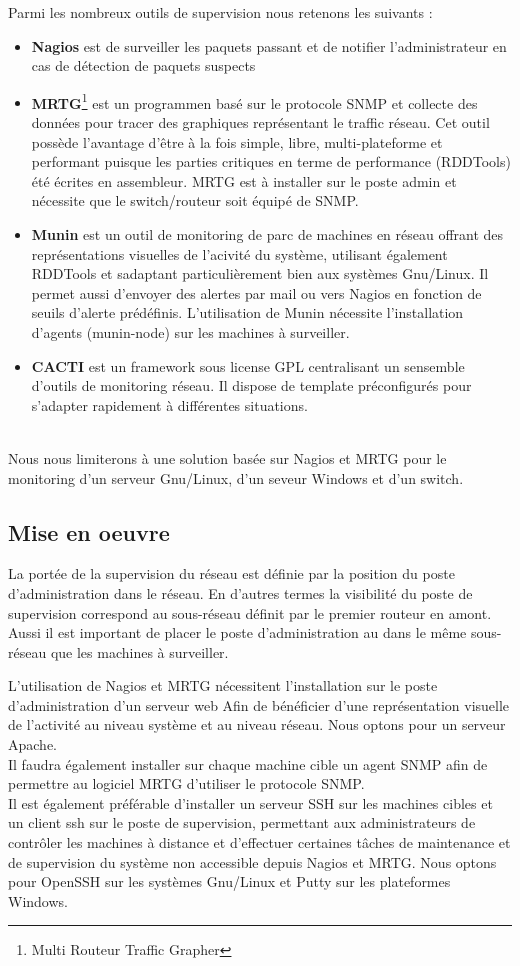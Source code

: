\documentclass[a4paper]{article}
\begin{document}
Parmi les nombreux outils de supervision nous retenons les suivants :
\begin{itemize}
\item \textbf{Nagios} est de surveiller les paquets passant et de notifier l'administrateur en cas de détection de paquets suspects
\item \textbf{MRTG}\footnote{Multi Routeur Traffic Grapher} est un programmen basé sur le protocole SNMP et collecte des données pour tracer des graphiques représentant le traffic réseau. Cet outil possède l'avantage d'être à la fois simple, libre, multi-plateforme et performant puisque les parties critiques en terme de performance (RDDTools) été écrites en assembleur. MRTG est à installer sur le poste admin et nécessite que le switch/routeur soit équipé de SNMP.
\item \textbf{Munin} est un outil de monitoring de parc de machines en réseau offrant des représentations visuelles de l'acivité du système, utilisant également RDDTools et sadaptant particulièrement bien aux systèmes Gnu/Linux. Il permet aussi d'envoyer des alertes par mail ou vers Nagios en fonction de seuils d'alerte prédéfinis. L'utilisation de Munin nécessite l'installation d'agents (munin-node) sur les machines à surveiller.
\item \textbf{CACTI} est un framework sous license GPL centralisant un sensemble d'outils de monitoring réseau. Il dispose de template préconfigurés pour s'adapter rapidement à différentes situations.
\end{itemize}
~\\
Nous nous limiterons à une solution basée sur Nagios et MRTG pour le monitoring d'un serveur Gnu/Linux, d'un seveur Windows et d'un switch. 

\subsection{Mise en oeuvre}
La portée de la supervision du réseau est définie par la position du poste d'administration dans le réseau. En d'autres termes la visibilité du poste de supervision correspond au sous-réseau définit par le premier routeur en amont. Aussi il est important de placer le poste d'administration au dans le même sous-réseau que les machines à surveiller.

L'utilisation de Nagios et MRTG nécessitent l'installation sur le poste d'administration d'un serveur web Afin de bénéficier d'une représentation visuelle de l'activité au niveau système et au niveau réseau. Nous optons pour un serveur Apache.\\
Il faudra également installer sur chaque machine cible un agent SNMP afin de permettre au logiciel MRTG d'utiliser le protocole SNMP.\\
Il est également préférable d'installer un serveur SSH sur les machines cibles et un client ssh sur le poste de supervision, permettant aux administrateurs de contrôler les machines à distance et d'effectuer certaines tâches de maintenance et de supervision du système non accessible depuis Nagios et MRTG. 
Nous optons pour OpenSSH sur les systèmes Gnu/Linux et Putty sur les plateformes Windows. 
\end{document}
